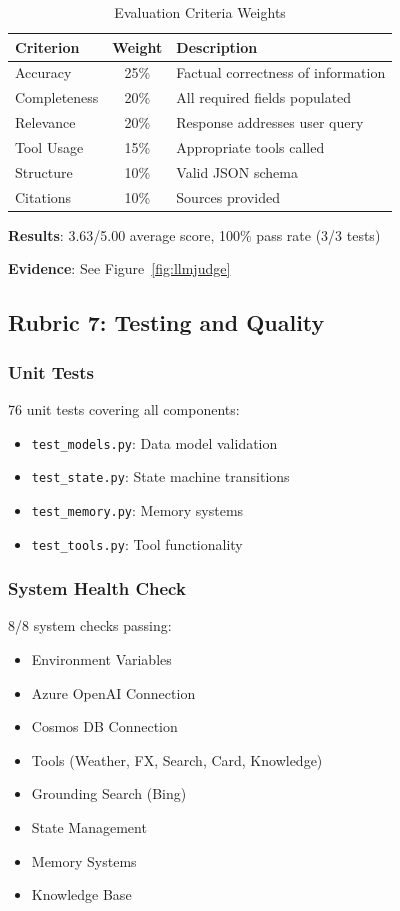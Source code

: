 \documentclass[11pt,a4paper]{article}
\begin{document}
\begin{table}[H]
\centering
\caption{Evaluation Criteria Weights}
\begin{tabular}{lcp{6cm}}
\toprule
\textbf{Criterion} & \textbf{Weight} & \textbf{Description} \\
\midrule
Accuracy & 25\% & Factual correctness of information \\
Completeness & 20\% & All required fields populated \\
Relevance & 20\% & Response addresses user query \\
Tool Usage & 15\% & Appropriate tools called \\
Structure & 10\% & Valid JSON schema \\
Citations & 10\% & Sources provided \\
\bottomrule
\end{tabular}
\end{table}

\textbf{Results}: 3.63/5.00 average score, 100\% pass rate (3/3 tests)

\textbf{Evidence}: See Figure~\ref{fig:llmjudge}

\subsection{Rubric 7: Testing and Quality}

\subsubsection{Unit Tests}
76 unit tests covering all components:
\begin{itemize}[noitemsep]
    \item \texttt{test\_models.py}: Data model validation
    \item \texttt{test\_state.py}: State machine transitions
    \item \texttt{test\_memory.py}: Memory systems
    \item \texttt{test\_tools.py}: Tool functionality
\end{itemize}

\subsubsection{System Health Check}
8/8 system checks passing:
\begin{itemize}[noitemsep]
    \item Environment Variables
    \item Azure OpenAI Connection
    \item Cosmos DB Connection
    \item Tools (Weather, FX, Search, Card, Knowledge)
    \item Grounding Search (Bing)
    \item State Management
    \item Memory Systems
    \item Knowledge Base
\end{itemize}
\end{document}
